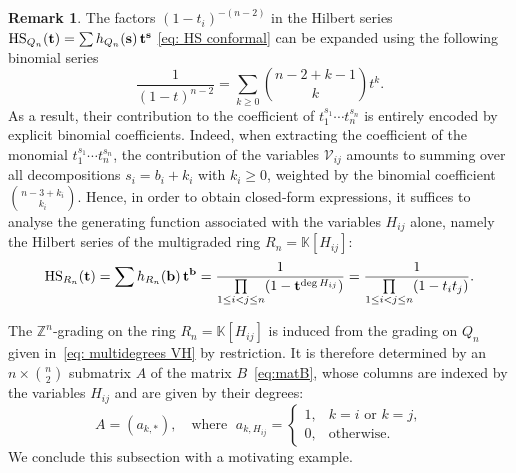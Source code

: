 \documentclass[12pt,a4paper]{extarticle}
\theoremstyle{definition}
\newtheorem{remark}[theorem]{Remark}
\newcommand{\K}{\mathbb{K}}
\begin{document}
\begin{remark}\label{rem: pass to a smaller ring}
The factors $(1-t_i)^{-(n-2)}$ in the Hilbert series ${\rm HS}_{Q_n}({\bf t}) = \sum  h_{Q_n}({\bf s})\, {\bf t}^{\bf s}$ \eqref{eq: HS conformal} can be expanded using the following binomial series
$$
\frac{1}{(1-t)^{n-2}}=\sum_{k\ge0}\binom{n-2+k-1}{k}t^k.
$$
As a result, their contribution to the coefficient of $t_1^{s_1}\cdots t_n^{s_n}$ is entirely
encoded by explicit binomial coefficients. Indeed, when extracting the coefficient of the monomial $t_1^{s_1}\cdots t_n^{s_n}$, the contribution of the
variables $\mathcal{V}_{ij}$ amounts to summing over all decompositions
$s_i=b_i+k_i$ with $k_i\ge0$, weighted by the binomial coefficient
$\binom{n-3+k_i}{k_i}$. Hence, in order to obtain closed‑form expressions,
it suffices to analyse the generating function associated with the variables $H_{ij}$ alone,
namely the Hilbert series of the multigraded ring $R_n=\K[H_{ij}]$:
\begin{equation}
    {\rm HS}_{R_n}({\bf t}) = \sum  h_{R_n}({\bf b})\, {\bf t}^{\bf b} = \frac{1}{\prod\limits_{1\leq i<j\leq n} (1-\mathbf{t}^{\deg H_{ij}})} = \frac{1}{\prod\limits_{1\le i<j\le n} (1-t_i t_j)}.
\end{equation}
\end{remark}
The $\mathbb{Z}^n$‑grading on the ring
$
R_n=\K[H_{ij}]
$
is induced from the grading on $Q_n$ given in~\eqref{eq: multidegrees VH} by restriction.
It is therefore determined by an $n\times\binom{n}{2}$ submatrix $A$ of the matrix $B$~\eqref{eq:matB}, whose columns are indexed by the variables $H_{ij}$ and are given by their degrees:
\begin{equation}\label{eq:matA}
A=(a_{k,*}), \quad \text{where } \;
a_{k,H_{ij}} =
\begin{cases}
1, & k=i \text{ or } k=j,\\
0, & \text{otherwise}.
\end{cases}
\end{equation}
We conclude this subsection with a motivating example.
\end{document}
